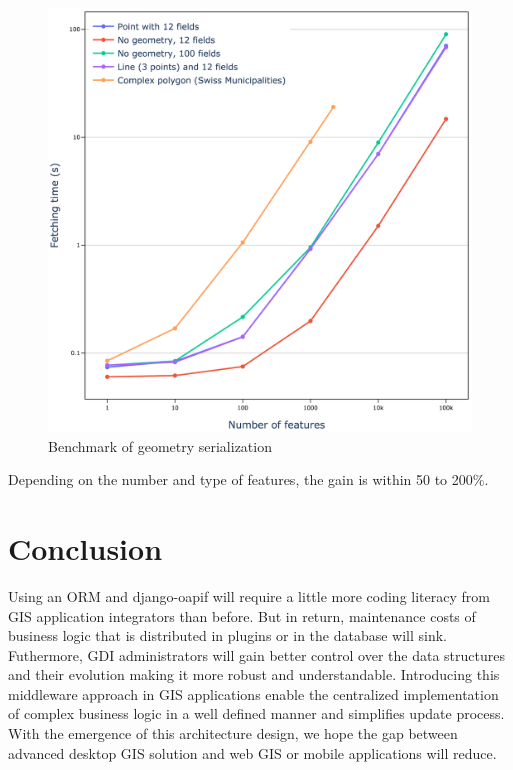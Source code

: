 \documentclass[runningheads]{llncs}
\begin{document}
\begin{figure}
	\includegraphics[width=\textwidth]{benchmarcka.png}
	\caption{Benchmark of geometry serialization} \label{fig6}
\end{figure}

Depending on the number and type of features, the gain is within 50 to 200\%.


\section{Conclusion}

Using an ORM and django-oapif will require a little more coding literacy from GIS application integrators than before. But in return, maintenance costs of business logic that is distributed in plugins or in the database will sink. Futhermore, GDI administrators will gain better control over the data structures and their evolution making it more robust and understandable. Introducing this middleware approach in GIS applications enable the centralized implementation of complex business logic in a  well defined manner and simplifies update process. With the emergence of this architecture design, we hope the gap between advanced desktop GIS solution and web GIS or mobile applications will reduce.
\end{document}
